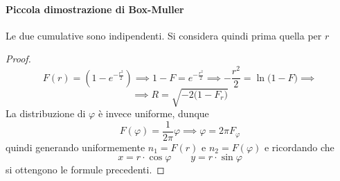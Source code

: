 \documentclass[10pt, oneside]{book}
\begin{document}
\paragraph{Piccola dimostrazione di Box-Muller}
Le due cumulative sono indipendenti. Si considera quindi prima quella per $r$
\begin{proof}
\[F(r) = (1 - e^{\displaystyle - \frac{r^2}{2}}) \implies 1 - F = e^{\displaystyle - \frac{r^2}{2}} \implies - \frac{r^2}{2} = \ln \big( 1 - F \big) \implies\]
\[\implies R = \sqrt{- 2 \big(1 - F_r\big)}\]
La distribuzione di $\varphi$ è invece uniforme, dunque
\[F(\varphi) = \frac{1}{2\pi}\varphi \implies \varphi = 2 \pi F_\varphi\]
quindi generando uniformemente $n_1 = F(r)$ e $n_2 = F(\varphi)$ e ricordando che
\[x = r \cdot \cos \varphi \qquad y = r \cdot \sin \varphi\]
si ottengono le formule precedenti.
\end{proof}
\end{document}
